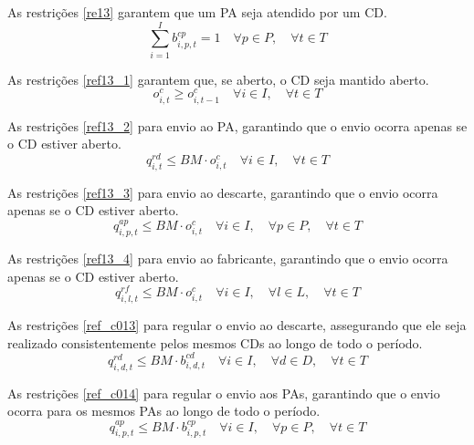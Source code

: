 As restrições \ref{re13} garantem que um PA seja atendido por um CD.
\begin{equation}\label{re13}
\sum_{i=1}^{I} b^{cp}_{i,p,t} = 1 \quad \forall p \in P, \quad \forall t \in T
\end{equation}

As restrições \ref{ref13_1} garantem que, se aberto, o CD seja mantido aberto.
\begin{equation}\label{ref13_1}
o^{c}_{i,t} \geq o^{c}_{i,t-1} \quad \forall i \in I, \quad \forall t \in T
\end{equation}

As restrições \ref{ref13_2}  para envio ao PA, garantindo que o envio ocorra apenas se o CD estiver aberto.
\begin{equation}\label{ref13_2}
q^{rd}_{i,t} \leq BM \cdot o^{c}_{i,t} \quad \forall i \in I, \quad \forall t \in T
\end{equation}

As restrições \ref{ref13_3}  para envio ao descarte, garantindo que o envio ocorra apenas se o CD estiver aberto.
\begin{equation}\label{ref13_3}
q^{ap}_{i,p,t} \leq BM \cdot o^{c}_{i,t} \quad \forall i \in I, \quad \forall p \in P, \quad \forall t \in T
\end{equation}

As restrições \ref{ref13_4}  para envio ao fabricante, garantindo que o envio ocorra apenas se o CD estiver aberto.
\begin{equation}\label{ref13_4}
q^{rf}_{i,l,t} \leq BM \cdot o^{c}_{i,t} \quad \forall i \in I, \quad \forall l \in L, \quad \forall t \in T
\end{equation}

As restrições \ref{ref_c013}  para regular o envio ao descarte, assegurando que ele seja realizado consistentemente pelos mesmos CDs ao longo de todo o período.
\begin{equation}\label{ref_c013}
q^{rd}_{i,d,t} \leq BM \cdot b^{cd}_{i,d,t} \quad \forall i \in I, \quad \forall d \in D, \quad \forall t \in T
\end{equation}

As restrições \ref{ref_c014}  para regular o envio aos PAs, garantindo que o envio ocorra para os mesmos PAs ao longo de todo o período.
\begin{equation}\label{ref_c014}
q^{ap}_{i,p,t} \leq BM \cdot b^{cp}_{i,p,t} \quad \forall i \in I, \quad \forall p \in P, \quad \forall t \in T
\end{equation}

